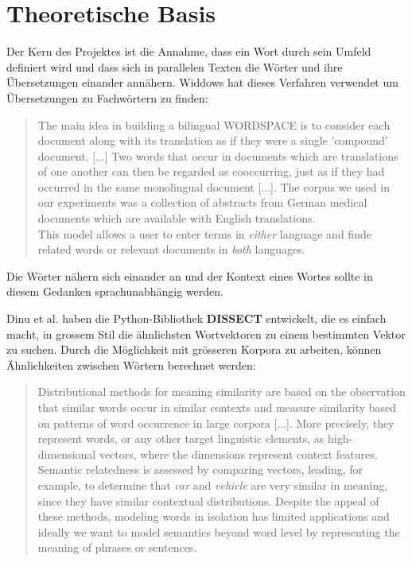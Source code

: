 \documentclass[11pt,twoside,openright]{mpreport}
\begin{document}
\chapter{Theoretische Basis}
\label{cha:theorie}
Der Kern des Projektes ist die Annahme, dass ein Wort durch sein Umfeld definiert wird und dass sich in parallelen Texten die Wörter und ihre Übersetzungen einander annähern. Widdows \citep[S. 190ff.]{geometry} hat dieses Verfahren verwendet um Übersetzungen zu Fachwörtern zu finden:
\begin{quote}
The main idea in building a bilingual WORDSPACE is to consider each document along with its translation as if they were a single 'compound' document. [...] Two words that occur in documents which are translations of one another can then be regarded as cooccurring, just as if they had occurred in the same monolingual document [...]. The corpus we used in our experiments was a collection of abstracts from German medical documents which are available with English translations.\\
This model allows a user to enter terms in \emph{either} language and finde related words or relevant documents in \emph{both} languages.
\end{quote}
Die Wörter nähern sich einander an und der Kontext eines Wortes sollte in diesem Gedanken sprachunabhängig werden.


Dinu et al. \cite{dissect} haben die Python-Bibliothek \textbf{DISSECT} entwickelt, die es einfach macht, in grossem Stil die ähnlichsten Wortvektoren zu einem bestimmten Vektor zu suchen. Durch die Möglichkeit mit grösseren Korpora zu arbeiten, können Ähnlichkeiten zwischen Wörtern berechnet werden:
\begin{quote}
Distributional methods for meaning similarity are based on the observation that similar words occur in similar contexts and measure similarity based on patterns of word occurrence in large corpora [...]. More precisely, they represent words, or any other target linguistic elements, as high-dimensional vectors, where the dimensions represent context features.\\
Semantic relatedness is assessed by comparing vectors, leading, for example, to determine that \emph{car} and \emph{vehicle} are very similar in meaning, since they have similar contextual distributions. Despite the appeal of these methods, modeling words in isolation has limited applications and ideally we want to model semantics beyond word level by representing the meaning of phrases or sentences.
\end{quote}
\end{document}
